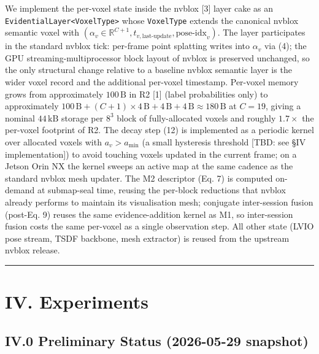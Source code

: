 \documentclass[
]{article}
\begin{document}
We implement the per-voxel state inside the nvblox {[}3{]} layer cake as
an \texttt{EvidentialLayer\textless{}VoxelType\textgreater{}} whose
\texttt{VoxelType} extends the canonical nvblox semantic voxel with
\((\alpha_v \in \mathbb{R}^{C+1}, t_{v,\text{last-update}}, \text{pose-idx}_v)\).
The layer participates in the standard nvblox tick: per-frame point
splatting writes into \(\alpha_v\) via (4); the GPU
streaming-multiprocessor block layout of nvblox is preserved unchanged,
so the only structural change relative to a baseline nvblox semantic
layer is the wider voxel record and the additional per-voxel timestamp.
Per-voxel memory grows from approximately \(100\,\text{B}\) in R2
{[}1{]} (label probabilities only) to approximately
\(100\,\text{B} + (C+1) \times 4\,\text{B} + 4\,\text{B} + 4\,\text{B} \approx 180\,\text{B}\)
at \(C = 19\), giving a nominal \(44\,\text{kB}\) storage per \(8^3\)
block of fully-allocated voxels and roughly \(1.7\times\) the per-voxel
footprint of R2. The decay step (12) is implemented as a periodic kernel
over allocated voxels with \(a_v > a_{\min}\) (a small hysteresis
threshold {[}TBD: see §IV implementation{]}) to avoid touching voxels
updated in the current frame; on a Jetson Orin NX the kernel sweeps an
active map at the same cadence as the standard nvblox mesh updater. The
M2 descriptor (Eq. 7) is computed on-demand at submap-seal time, reusing
the per-block reductions that nvblox already performs to maintain its
visualisation mesh; conjugate inter-session fusion (post-Eq. 9) reuses
the same evidence-addition kernel as M1, so inter-session fusion costs
the same per-voxel as a single observation step. All other state (LVIO
pose stream, TSDF backbone, mesh extractor) is reused from the upstream
nvblox release.

\begin{center}\rule{0.5\linewidth}{0.5pt}\end{center}

\section{IV. Experiments}\label{iv-experiments}

\subsection{IV.0 Preliminary Status (2026-05-29
snapshot)}\label{iv0-preliminary-status-2026-05-29-snapshot}
\end{document}
